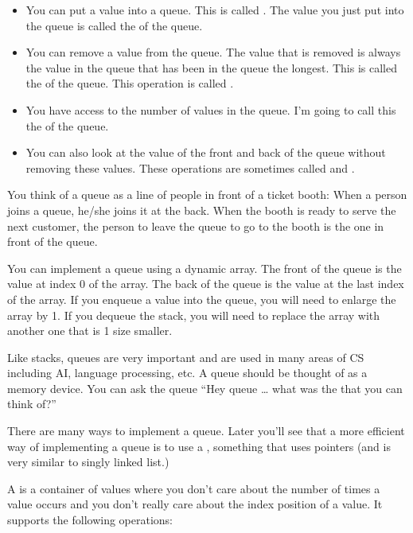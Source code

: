 \begin{itemize}
\item
  You can put a value into a queue. This is called . The
  value you just put into the queue is called the  of the
  queue.
\item
  You can remove a value from the queue. The value that is removed is
  always the value in the queue that has been in the queue the longest.
  This is called the  of the queue. This operation is
  called .
\item
  You have access to the number of values in the queue. I'm going to
  call this the  of the queue.
\item
  You can also look at the value of the front and back of the queue
  without removing these values. These operations are sometimes called
   and .
\end{itemize}

You think of a queue as a line of people in front of a ticket booth: When a person joins a queue, he/she joins it at the back. When the booth is ready to serve the next customer, the person to leave the queue to go to the booth is the one in front of the queue.

You can implement a queue using a dynamic array. The front of the queue is the value at index 0 of the array. The back of the queue is the value at the last index of the array. If you enqueue a value into the queue, you will need to enlarge the array by 1. If you dequeue the stack, you will need to replace the array with another one that is 1 size smaller.

Like stacks, queues are very important and are used in many areas of CS including AI, language processing, etc. A queue should be thought of as a memory device. You can ask the queue ``Hey queue \ldots{} what was the  that you can think of?''


There are many ways to implement a queue. Later you'll see that a more efficient way of implementing a queue is to use a , something that uses pointers (and is very similar to singly linked list.)

\newpage{}

A  is a container of values where you don't care about the number of times a value occurs and you don't really care about the index position of a value. It supports the following operations:

